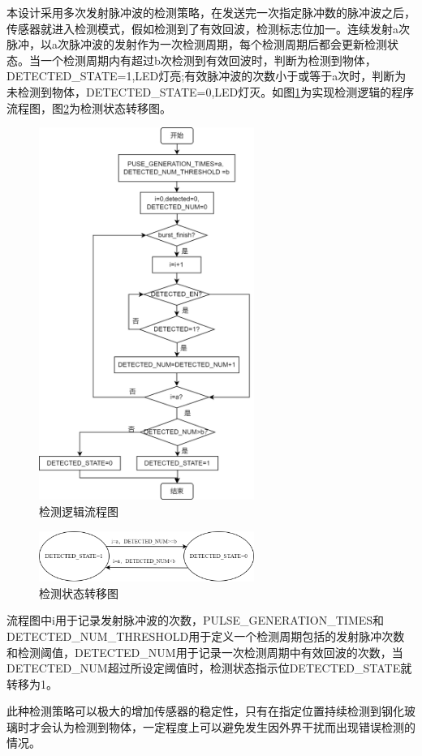       本设计采用多次发射脉冲波的检测策略，在发送完一次指定脉冲数的脉冲波之后，传感器就进入检测模式，假如检测到了有效回波，检测标志位加一。连续发射a次脉冲，以a次脉冲波的发射作为一次检测周期，每个检测周期后都会更新检测状态。当一个检测周期内有超过b次检测到有效回波时，判断为检测到物体，DETECTED\_STATE=1,LED灯亮;有效脉冲波的次数小于或等于a次时，判断为未检测到物体，DETECTED\_STATE=0,LED灯灭。如图\ref{检测逻辑流程图}为实现检测逻辑的程序流程图，图\ref{检测状态转移图}为检测状态转移图。
       \begin{figure}[!h]
  		\centering
		\includegraphics[width=7cm]{figure/detection logic.png}
		\caption{检测逻辑流程图}
		\label{检测逻辑流程图}%
\end{figure}
     \begin{figure}[!h]
	\centering
	\includegraphics[width=7cm]{figure/LED state transition diagram.png}
	\caption{检测状态转移图}
	\label{检测状态转移图}%
\end{figure}\par
流程图中i用于记录发射脉冲波的次数，PULSE\_GENERATION\_TIMES和DETECTED\_NUM\_THRESHOLD用于定义一个检测周期包括的发射脉冲次数和检测阈值，DETECTED\_NUM用于记录一次检测周期中有效回波的次数，当DETECTED\_NUM超过所设定阈值时，检测状态指示位DETECTED\_STATE就转移为1。\par
    此种检测策略可以极大的增加传感器的稳定性，只有在指定位置持续检测到钢化玻璃时才会认为检测到物体，一定程度上可以避免发生因外界干扰而出现错误检测的情况。
 
